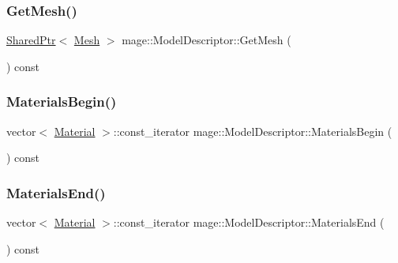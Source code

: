\subsubsection{\texorpdfstring{Get\+Mesh()}{GetMesh()}}
{\footnotesize\ttfamily \hyperlink{namespacemage_a1e01ae66713838a7a67d30e44c67703e}{Shared\+Ptr}$<$ \hyperlink{classmage_1_1_mesh}{Mesh} $>$ mage\+::\+Model\+Descriptor\+::\+Get\+Mesh (\begin{DoxyParamCaption}{ }\end{DoxyParamCaption}) const}

\hypertarget{classmage_1_1_model_descriptor_a64a2ca531c03cd8d79eda3a728e6efa1}{}\label{classmage_1_1_model_descriptor_a64a2ca531c03cd8d79eda3a728e6efa1} 
\subsubsection{\texorpdfstring{Materials\+Begin()}{MaterialsBegin()}}
{\footnotesize\ttfamily vector$<$ \hyperlink{structmage_1_1_material}{Material} $>$\+::const\+\_\+iterator mage\+::\+Model\+Descriptor\+::\+Materials\+Begin (\begin{DoxyParamCaption}{ }\end{DoxyParamCaption}) const}

\hypertarget{classmage_1_1_model_descriptor_a3e1880190d58d4d1bc308766f804047d}{}\label{classmage_1_1_model_descriptor_a3e1880190d58d4d1bc308766f804047d} 
\subsubsection{\texorpdfstring{Materials\+End()}{MaterialsEnd()}}
{\footnotesize\ttfamily vector$<$ \hyperlink{structmage_1_1_material}{Material} $>$\+::const\+\_\+iterator mage\+::\+Model\+Descriptor\+::\+Materials\+End (\begin{DoxyParamCaption}{ }\end{DoxyParamCaption}) const}

\hypertarget{classmage_1_1_model_descriptor_a721a81fae1d5613af8a3a037577ce454}{}\label{classmage_1_1_model_descriptor_a721a81fae1d5613af8a3a037577ce454} 
